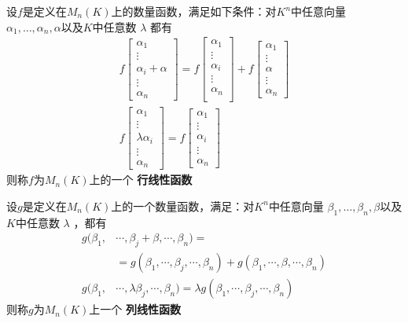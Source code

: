 \documentclass[11pt]{article}
\begin{document}
\begin{definition}[]
设\(f\)是定义在\(M_n(K)\)上的数量函数，满足如下条件：对\(K^n\)中任意向量
\(\alpha_1,\dots,\alpha_n,\alpha\)以及\(K\)中任意数 \(\lambda\) 都有
\begin{gather*}
f
\begin{bmatrix}
\alpha_1\\\vdots\\\alpha_i+\alpha\\\vdots\\\alpha_n
\end{bmatrix}=
f
\begin{bmatrix}
\alpha_1\\\vdots\\\alpha_i\\\vdots\\\alpha_n\\
\end{bmatrix}+
f
\begin{bmatrix}
\alpha_1\\\vdots\\\alpha\\\vdots\\\alpha_n
\end{bmatrix}\\
f
\begin{bmatrix}
\alpha_1\\\vdots\\\lambda\alpha_i\\\vdots\\\alpha_n
\end{bmatrix}=f
\begin{bmatrix}
\alpha_1\\\vdots\\\alpha_i\\\vdots\\\alpha_n
\end{bmatrix}
\end{gather*}
则称\(f\)为\(M_n(K)\)上的一个 \textbf{行线性函数}

设\(g\)是定义在\(M_n(K)\)上的一个数量函数，满足：对\(K^n\)中任意向量
\(\beta_1,\dots,\beta_n,\beta\)以及\(K\)中任意数 \(\lambda\) ，都有
\begin{align*}
g(\beta_1,&\cdots,\beta_j+\beta,\cdots,\beta_n)=\\
&=g(\beta_1,\cdots,\beta_j,\cdots,\beta_n)+g(\beta_1,\cdots,\beta,\cdots,\beta_n)\\
g(\beta_1,&\cdots,\lambda\beta_j,\cdots,\beta_n)=\lambda g(\beta_1,\cdots,\beta_j,\cdots,\beta_n)
\end{align*}
则称\(g\)为\(M_n(K)\)上一个 \textbf{列线性函数}
\end{definition}
\end{document}
